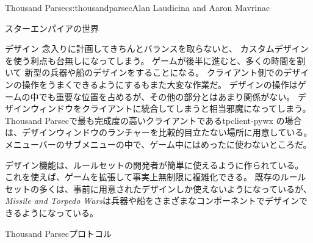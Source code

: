 \begin{aosachapter}{Thousand Parsec}{s:thousandparsec}{Alan Laudicina and Aaron Mavrinac}
\begin{aosasect1}{スターエンパイアの世界}
\begin{aosasect2}{デザイン}
念入りに計画してきちんとバランスを取らないと、
カスタムデザインを使う利点も台無しになってしまう。
ゲームが後半に進むと、多くの時間を割いて
新型の兵器や船のデザインをすることになる。
クライアント側でのデザインの操作をうまくできるようにするもまた大変な作業だ。
デザインの操作はゲームの中でも重要な位置を占めるが、その他の部分とはあまり関係がない。
デザインウィンドウをクライアントに統合してしまうと相当邪魔になってしまう。
Thousand Parsecで最も完成度の高いクライアントであるtpclient-pywx
の場合は、デザインウィンドウのランチャーを比較的目立たない場所に用意している。
メニューバーのサブメニューの中で、ゲーム中にはめったに使わないところだ。

デザイン機能は、ルールセットの開発者が簡単に使えるように作られている。
これを使えば、ゲームを拡張して事実上無制限に複雑化できる。
既存のルールセットの多くは、事前に用意されたデザインしか使えないようになっているが、
\emph{Missile and Torpedo Wars}は兵器や船をさまざまなコンポーネントでデザインできるようになっている。

\end{aosasect2}

\end{aosasect1}

\begin{aosasect1}{Thousand Parsecプロトコル}


\end{aosasect1}
\end{aosachapter}
